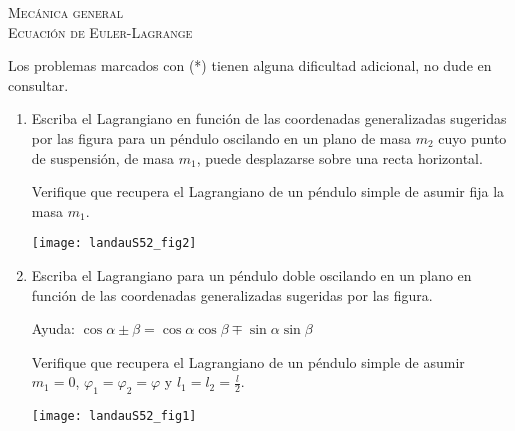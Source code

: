 \documentclass[11pt,spanish,a4paper]{article}
\begin{document}
\begin{center}
  \textsc{\large Mecánica general}\\
  \textsc{\large Ecuación de Euler-Lagrange}
\end{center}

\noindent
Los problemas marcados con (*) tienen alguna dificultad adicional, no dude en consultar.
\begin{enumerate}

\item \begin{minipage}[t][3cm]{0.7\textwidth}
Escriba el Lagrangiano en función de las coordenadas generalizadas sugeridas por las figura para un péndulo oscilando en un plano de masa \(m_2\) cuyo punto de suspensión, de masa \(m_1\), puede desplazarse sobre una recta horizontal.

Verifique que recupera el Lagrangiano de un péndulo simple de asumir fija la masa \(m_1\).
\end{minipage}
\begin{minipage}[c][1em][t]{0.3\textwidth}
	\texttt{[image: landauS52\_fig2]}
\end{minipage}


\item \begin{minipage}[t][4.5cm]{0.7\textwidth}
Escriba el Lagrangiano para un péndulo doble oscilando en un plano en función de las coordenadas generalizadas sugeridas por las figura.

Ayuda: \( \cos{\alpha \pm \beta }=\cos{ \alpha} \cos{ \beta \mp \sin \alpha} \sin{ \beta } \)

Verifique que recupera el Lagrangiano de un péndulo simple de asumir \(m_1=0\), \(\varphi_1 = \varphi_2 = \varphi\) y \(l_1 = l_2 = \frac{l}{2}\).
\end{minipage}
	\begin{minipage}[c][1em][t]{0.3\textwidth}
        \texttt{[image: landauS52\_fig1]}
    \end{minipage}


\end{enumerate}
\end{document}
